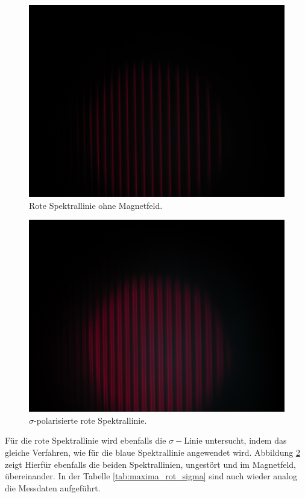 \begin{figure}
    \centering
    \includegraphics[width=\textwidth]{fotos/rot_0.JPG}
    \caption{Rote Spektrallinie ohne Magnetfeld.}
    \label{fig:rot_0}
\end{figure}
\hfill
\begin{figure}
    \centering
    \includegraphics[width=\textwidth]{fotos/rot_sigma.JPG}
    \caption{$\sigma$-polarisierte rote Spektrallinie.}
    \label{fig:rot_sigma}
\end{figure}
\FloatBarrier
Für die rote Spektrallinie wird ebenfalls die $\sigma-$Linie untersucht, indem das gleiche Verfahren, wie für die blaue Spektrallinie 
angewendet wird. Abbildung \ref{fig:rot_sigma} zeigt Hierfür ebenfalls die beiden Spektrallinien, ungestört und im Magnetfeld, übereinander. In der Tabelle \ref{tab:maxima_rot_sigma}
sind auch wieder analog die Messdaten aufgeführt.\\

